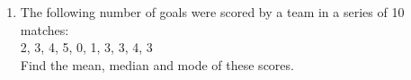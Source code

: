\renewcommand{\theequation}{\theenumi}
\begin{enumerate}[label=\thesection.\arabic*.,ref=\thesection.\theenumi]
\item The following number of goals were scored
by a team in a series of 10 matches:\\
2, 3, 4, 5, 0, 1, 3, 3, 4, 3\\
Find the mean, median and mode of these
scores.
\end{enumerate}